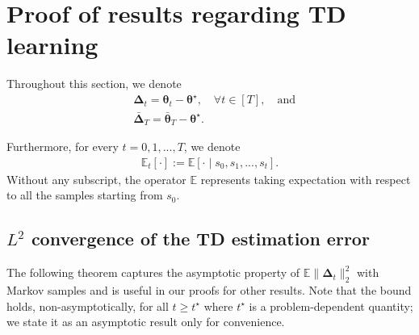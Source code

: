 \section{Proof of results regarding TD learning}\label{app:proof-TD}

Throughout this section, we denote
\begin{align}
&\bm{\Delta}_t = \bm{\theta}_t - \bm{\theta}^\star, \quad \forall t \in [T], \quad \text{and}  \\
&\bar{\bm{\Delta}}_T = \bar{\bm{\theta}}_T - \bm{\theta}^\star.
\end{align}

Furthermore, for every $t = 0,1,...,T$, we denote 
\begin{align*}
\mathbb{E}_t[\cdot] := \mathbb{E}[\cdot \mid s_0,s_1,...,s_t].
\end{align*}
Without any subscript, the operator $\mathbb{E}$ represents taking expectation with respect to all the samples starting from $s_0$.

\subsection{$L^2$ convergence of the TD estimation error}
The following theorem captures the asymptotic property of $\mathbb{E}\|\bm{\Delta}_t\|_2^2$ with Markov samples and is useful in our proofs for other results. 
Note that the bound holds, non-asymptotically, for all $t \geq t^\star$ where $t^\star$ is a problem-dependent quantity; we state it as an asymptotic result only for convenience.

